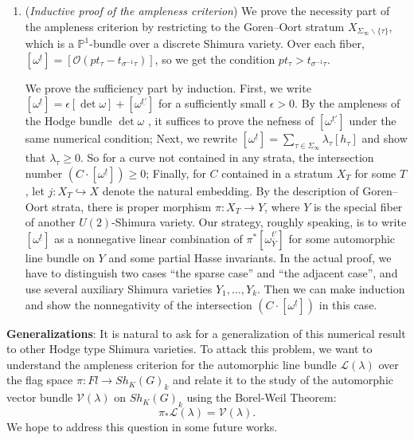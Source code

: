 \documentclass{article}
\begin{document}
\begin{enumerate}
	\item (\emph{Inductive proof of the ampleness criterion}) We prove the necessity part of the ampleness criterion by restricting to the Goren--Oort stratum $X_{\Sigma_\infty\backslash\{\tau\}}$, which is a  $\mathbb{P}^1$-bundle over a discrete Shimura variety. Over each fiber, $[\omega^{\underline{t}}]=[\mathcal{O}(pt_\tau-t_{\sigma^{-1}\tau})]$, so we get the condition $pt_\tau>t_{\sigma^{-1}\tau}$.
	
	We prove the sufficiency part by induction. First, we write $[\omega^{\underline{t}}]=\epsilon[\det\omega]+[\omega^{\underline{t'}}]$ for a sufficiently small $\epsilon>0$. By the ampleness of the Hodge bundle $\det\omega$ \citep{Lan}, it suffices to prove the nefness of $[\omega^{\underline{t'}}]$ under the same numerical condition; Next, we rewrite $[\omega^{\underline{t}}]=\sum\limits_{\tau\in\Sigma_\infty}\lambda_\tau[h_\tau]$ and show that $\lambda_\tau\ge0$. So for a curve not contained in any strata, the intersection number $(C\cdot [\omega^{\underline{t}}])\ge0$; Finally, for $C$ contained in a stratum $X_T$ for some $T$, let $j:X_T\hookrightarrow X$ denote the natural embedding. By the description of Goren--Oort strata, there is proper morphism $\pi: X_T\longrightarrow Y$, where $Y$ is the special fiber of another $U(2)$-Shimura variety. Our strategy, roughly speaking, is to write $[\omega^{\underline{t}}]$ as a nonnegative linear combination of $\pi^\ast [\omega_Y^{\underline{t'}}]$ for some automorphic line bundle on $Y$ and some partial Hasse invariants. In the actual proof, we have to distinguish two cases ``the sparse case'' and ``the adjacent case'', and use several auxiliary Shimura varieties $Y_1,\dots, Y_k$. Then we can make induction and show the nonnegativity of the intersection $(C\cdot [\omega^{\underline{t}}])$ in this case.
	
\end{enumerate}



\medskip
\noindent
\textbf{Generalizations}: It is natural to ask for a generalization of this numerical result to other Hodge type Shimura varieties. To attack this problem, we want to understand the ampleness criterion for the automorphic line bundle $\mathcal{L}(\lambda)$ over the flag space $\pi:Fl\longrightarrow Sh_K(G)_k$ and relate it to the study of the automorphic vector bundle $\mathcal{V}(\lambda)$ on $Sh_K(G)_k$ using the Borel-Weil Theorem:
\begin{equation}
	\pi_\ast \mathcal{L}(\lambda)=\mathcal{V}(\lambda).
\end{equation}
We hope to address this question in some future works.
\end{document}
